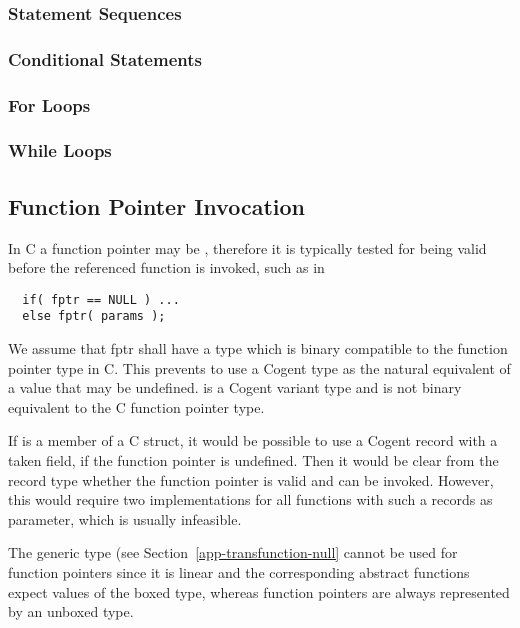 \subsubsection{Statement Sequences}

\subsubsection{Conditional Statements}

\subsubsection{For Loops}

\subsubsection{While Loops}


\subsection{Function Pointer Invocation}
\label{app-transfunction-pointer}

In C a function pointer may be , therefore it is typically tested for being valid before the
referenced function is invoked, such as in 
\begin{verbatim}
  if( fptr == NULL ) ...
  else fptr( params );
\end{verbatim}
We assume that fptr shall have a type which is binary compatible to the function pointer type in C.
This prevents to use a Cogent type  as the natural equivalent of a value that may be undefined.
 is a Cogent variant type and is not binary equivalent to the C function pointer type.

If  is a member of a C struct, it would be possible to use a Cogent record with a taken field,
if the function pointer is undefined. Then it would be clear from the record type whether the function pointer
is valid and can be invoked. However, this would require two implementations for all functions with such a records 
as parameter, which is usually infeasible.

The generic type  (see Section~\ref{app-transfunction-null} cannot be used for function pointers since
it is linear and the corresponding abstract functions expect values of the boxed type, whereas function pointers
are always represented by an unboxed type.


